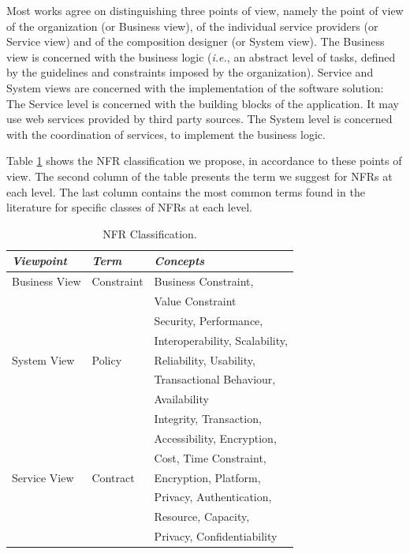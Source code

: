\documentclass{sig-alternate}
\begin{document}
Most works agree on distinguishing three points of view, namely the point of view of the organization (or Business view), of the individual service providers (or Service view) and of the composition designer (or System view).
The Business view is concerned with the business logic (\textit{i.e.}, an abstract level of tasks, defined by the guidelines and constraints imposed by the organization).
Service and System views are concerned with the implementation of the software solution: The Service level is concerned with the building blocks of the application.
It may use web services provided by third party sources.
The System level is concerned with the coordination of services, to implement the business logic.

 


Table \ref{tab:result04} shows the NFR classification we propose, in accordance to these points of view.
The second column of the table presents the term we suggest for NFRs at each level.
The last column contains the most common terms found in the literature for specific classes of NFRs at each level.

\begin{table}[ht!]
\centering
\small
\begin{tabular}{l|l|l}
  \hline 
  \hline
   \textbf{\textit{Viewpoint}} & \textbf{\textit{Term}} & \textbf{\textit{Concepts}}  
   \\
  \hline
  \hline   
  Business View & Constraint  & Business Constraint,    
 \\  
  &   & Value Constraint\\
   \hline    
 
   &  & Security, Performance,\\ 
   & & Interoperability, Scalability,\\
  System View & Policy & Reliability, Usability,\\
   & & Transactional Behaviour,\\
   & & Availability \\ 
   \hline
     &  & Integrity, Transaction,  \\
   &  & Accessibility, Encryption, \\
   &  & Cost, Time Constraint, \\
  Service View & Contract & Encryption, Platform, \\
   &  & Privacy, Authentication, \\
   &  & Resource, Capacity, \\
   &  & Privacy, Confidentiability 
   \\   \hline
  \hline  
\end{tabular}
\caption{NFR Classification.}
\label{tab:result04}
\end{table} 
\end{document}
